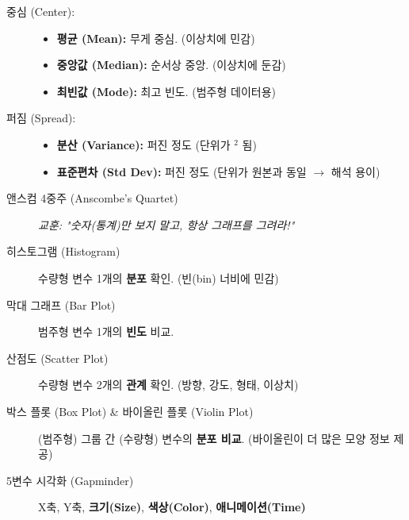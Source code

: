 \documentclass[11pt,a4paper]{book}
\theoremstyle{definition}
\begin{document}
\begin{tcolorbox}[title={\textbf{4. 기술 통계 (Descriptive Statistics)}, colback=gray!10}]
\begin{description}
    \item[중심 (Center):]
    \begin{itemize}
        \item \textbf{평균 (Mean):} 무게 중심. (이상치에 민감)
        \item \textbf{중앙값 (Median):} 순서상 중앙. (이상치에 둔감)
        \item \textbf{최빈값 (Mode):} 최고 빈도. (범주형 데이터용)
    \end{itemize}
    \item[퍼짐 (Spread):]
    \begin{itemize}
        \item \textbf{분산 (Variance):} 퍼진 정도 (단위가 $^2$ 됨)
        \item \textbf{표준편차 (Std Dev):} 퍼진 정도 (단위가 원본과 동일 $\rightarrow$ 해석 용이)
    \end{itemize}
\end{description}
\end{tcolorbox}

\begin{tcolorbox}[title={\textbf{5. 핵심 시각화 (Key Visualizations)}, colback=gray!10}]
\begin{description}
    \item[앤스컴 4중주 (Anscombe's Quartet)]
    \textit{교훈: "숫자(통계)만 보지 말고, 항상 그래프를 그려라!"}

    \item[히스토그램 (Histogram)]
    수량형 변수 1개의 \textbf{분포} 확인. (빈(bin) 너비에 민감)

    \item[막대 그래프 (Bar Plot)]
    범주형 변수 1개의 \textbf{빈도} 비교.

    \item[산점도 (Scatter Plot)]
    수량형 변수 2개의 \textbf{관계} 확인. (방향, 강도, 형태, 이상치)

    \item[박스 플롯 (Box Plot) \& 바이올린 플롯 (Violin Plot)]
    (범주형) 그룹 간 (수량형) 변수의 \textbf{분포 비교}. (바이올린이 더 많은 모양 정보 제공)

    \item[5변수 시각화 (Gapminder)]
    X축, Y축, \textbf{크기(Size)}, \textbf{색상(Color)}, \textbf{애니메이션(Time)}
\end{description}
\end{tcolorbox}
\end{document}
